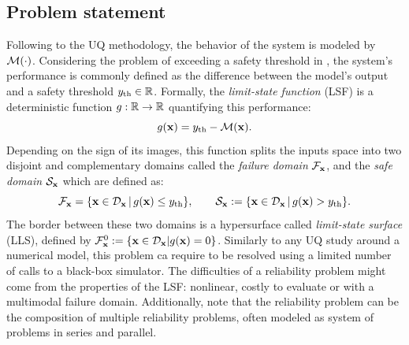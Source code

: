 \subsection{Problem statement}

Following to the UQ methodology, the behavior of the system is modeled by $\mathcal{M}(\cdot)$. 
Considering the problem of exceeding a safety threshold in , the system's performance is commonly defined as the difference between the model's output and a safety threshold $y_\mathrm{th}\in\mathbb{R}$. 
Formally, the \textit{limit-state function} (LSF) is a deterministic function $g:\mathbb{R}\rightarrow\mathbb{R}$ quantifying this performance: 
\begin{equation}
    g({\bf x}) = y_\mathrm{th} - \mathcal{M}({\bf x}).
\end{equation}
Depending on the sign of its images, this function splits the inputs space into two disjoint and complementary domains called  
the \textit{failure domain} $\mathcal{F}_{{\bf x}}$, and the \textit{safe domain} $\mathcal{S}_{\bf x}$ which are defined as:
\begin{equation}
    \mathcal{F}_{{\bf x}} = \{{\bf x} \in \mathcal{D}_{\bf x} \, | \,  g({\bf x}) \leq y_\mathrm{th}\}, \qquad 
    \mathcal{S}_{\bf x} := \{{\bf x} \in \mathcal{D}_{\bf x} \, | \, g({\bf x}) > y_\mathrm{th}\}. 
\end{equation}
The border between these two domains is a hypersurface called \textit{limit-state surface} (LLS), defined by $\mathcal{F}_{{\bf x}}^0 := \{{\bf x} \in \mathcal{D}_{\bf x} | g({\bf x}) = 0\}$.
Similarly to any UQ study around a numerical model, this problem ca require to be resolved using a limited number of calls to a black-box simulator.
The difficulties of a reliability problem might come from the properties of the LSF: nonlinear, costly to evaluate or with a multimodal failure domain. 
Additionally, note that the reliability problem can be the composition of multiple reliability problems, often modeled as system of problems in series and parallel.

